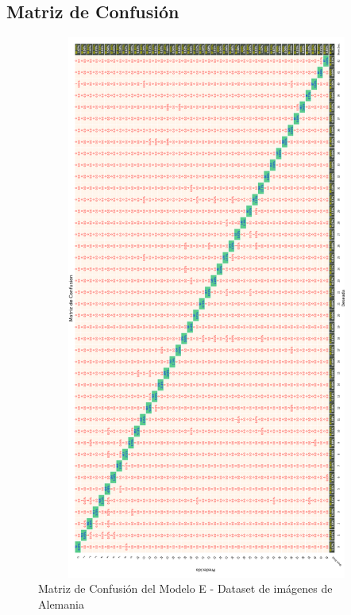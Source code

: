 	 	\subsection{Matriz de Confusión}  
			\begin{figure}[H]
				\begin{center}
				\includegraphics[width=1\textwidth, height=18cm]{images/desarrollo/testResults/german/model_A_A} 
				\end{center}
				\begin{center}
				\caption{\small{Matriz de Confusión del Modelo E - Dataset de imágenes de Alemania}}
				{\small{\fontsize{10}{16.8}\selectfont {Fuente: Elaboración propia}}}
				\end{center}
				\vspace{-1.5em}
			\end{figure}

